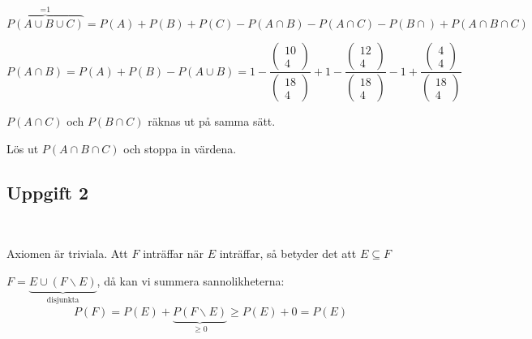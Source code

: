 \noindent $\overbrace{P(A\cup B\cup C)}^{\text{=1}} = P(A)+P(B)+P(C)-P(A\cap B)-P(A\cap C)-P(B\cap)+P(A\cap B\cap C)$\par
\noindent $P(A\cap B) = P(A)+P(B)-P(A\cup B) = 1-\dfrac{\begin{pmatrix}10\\4\end{pmatrix}}{\begin{pmatrix}18\\4\end{pmatrix}}+1-\dfrac{\begin{pmatrix}12\\4\end{pmatrix}}{\begin{pmatrix}18\\4\end{pmatrix}}-1+\dfrac{\begin{pmatrix}4\\4\end{pmatrix}}{\begin{pmatrix}18\\4\end{pmatrix}}$\par
\noindent $P(A\cap C)$ och $P(B\cap C)$ räknas ut på samma sätt.\par
\noindent Lös ut $P(A\cap B\cap C)$ och stoppa in värdena.
\par\bigskip
\subsection{Uppgift 2}\hfill\\\par
\noindent  Axiomen är triviala. Att $F$ inträffar när $E$ inträffar, så betyder det att $E\subseteq F$ \par
\noindent $F = \underbrace{E\cup (F\backslash E)}_{\text{disjunkta}}$, då kan vi summera sannolikheterna:
\begin{equation*}
  \begin{gathered}
    P(F) = P(E)+\underbrace{P(F\backslash E)}_{\text{$\geq0$}}\geq P(E)+0 = P(E)
  \end{gathered}
\end{equation*}
\par\bigskip
